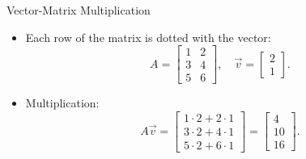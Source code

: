 \documentclass{beamer}
\begin{document}
\begin{frame}{Vector-Matrix Multiplication}
  \begin{itemize}
    \item Each row of the matrix is dotted with the vector:
    \begin{equation}
    A = \begin{bmatrix} 1 & 2 \\ 3 & 4 \\ 5 & 6 \end{bmatrix}, \quad \vec{v} = \begin{bmatrix} 2 \\ 1 \end{bmatrix}.
    \end{equation}
    \item Multiplication:
    \begin{equation}
    A\vec{v} = \begin{bmatrix}
    1\cdot2 + 2\cdot1 \\
    3\cdot2 + 4\cdot1 \\
    5\cdot2 + 6\cdot1
    \end{bmatrix} = \begin{bmatrix} 4 \\ 10 \\ 16 \end{bmatrix}.
    \end{equation}
  \end{itemize}
\end{frame}
\end{document}
